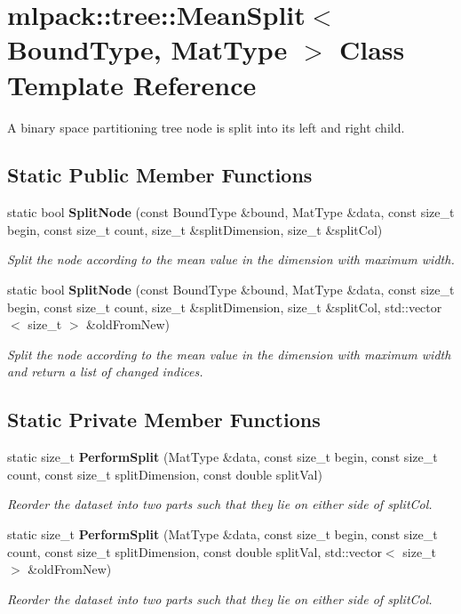 \section{mlpack\-:\-:tree\-:\-:Mean\-Split$<$ Bound\-Type, Mat\-Type $>$ Class Template Reference}
\label{classmlpack_1_1tree_1_1MeanSplit}


A binary space partitioning tree node is split into its left and right child.  


\subsection*{Static Public Member Functions}
\begin{DoxyCompactItemize}
\item 
static bool {\bf Split\-Node} (const Bound\-Type \&bound, Mat\-Type \&data, const size\-\_\-t begin, const size\-\_\-t count, size\-\_\-t \&split\-Dimension, size\-\_\-t \&split\-Col)
\begin{DoxyCompactList}\small\item\em Split the node according to the mean value in the dimension with maximum width. \end{DoxyCompactList}\item 
static bool {\bf Split\-Node} (const Bound\-Type \&bound, Mat\-Type \&data, const size\-\_\-t begin, const size\-\_\-t count, size\-\_\-t \&split\-Dimension, size\-\_\-t \&split\-Col, std\-::vector$<$ size\-\_\-t $>$ \&old\-From\-New)
\begin{DoxyCompactList}\small\item\em Split the node according to the mean value in the dimension with maximum width and return a list of changed indices. \end{DoxyCompactList}\end{DoxyCompactItemize}
\subsection*{Static Private Member Functions}
\begin{DoxyCompactItemize}
\item 
static size\-\_\-t {\bf Perform\-Split} (Mat\-Type \&data, const size\-\_\-t begin, const size\-\_\-t count, const size\-\_\-t split\-Dimension, const double split\-Val)
\begin{DoxyCompactList}\small\item\em Reorder the dataset into two parts such that they lie on either side of split\-Col. \end{DoxyCompactList}\item 
static size\-\_\-t {\bf Perform\-Split} (Mat\-Type \&data, const size\-\_\-t begin, const size\-\_\-t count, const size\-\_\-t split\-Dimension, const double split\-Val, std\-::vector$<$ size\-\_\-t $>$ \&old\-From\-New)
\begin{DoxyCompactList}\small\item\em Reorder the dataset into two parts such that they lie on either side of split\-Col. \end{DoxyCompactList}\end{DoxyCompactItemize}


